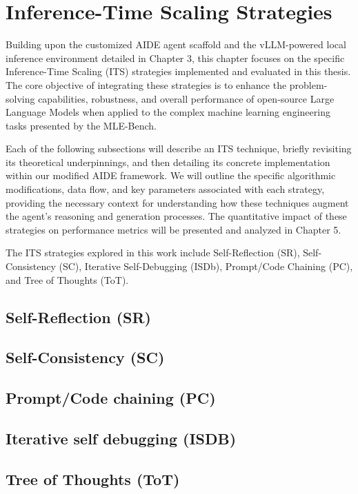 \chapter{Inference-Time Scaling Strategies}

Building upon the customized AIDE agent scaffold and the vLLM-powered local inference environment detailed in Chapter 3, this chapter focuses on the specific Inference-Time Scaling (ITS) strategies implemented and evaluated in this thesis. The core objective of integrating these strategies is to enhance the problem-solving capabilities, robustness, and overall performance of open-source Large Language Models when applied to the complex machine learning engineering tasks presented by the MLE-Bench.

Each of the following subsections will describe an ITS technique, briefly revisiting its theoretical underpinnings, and then detailing its concrete implementation within our modified AIDE framework. We will outline the specific algorithmic modifications, data flow, and key parameters associated with each strategy, providing the necessary context for understanding how these techniques augment the agent's reasoning and generation processes. The quantitative impact of these strategies on performance metrics will be presented and analyzed in Chapter 5.

The ITS strategies explored in this work include Self-Reflection (SR), Self-Consistency (SC), Iterative Self-Debugging (ISDb), Prompt/Code Chaining (PC), and Tree of Thoughts (ToT).

\section{Self-Reflection (SR)}

\section{Self-Consistency (SC)}

\section{Prompt/Code chaining (PC)}

\section{Iterative self debugging (ISDB)}

\section{Tree of Thoughts (ToT)}
